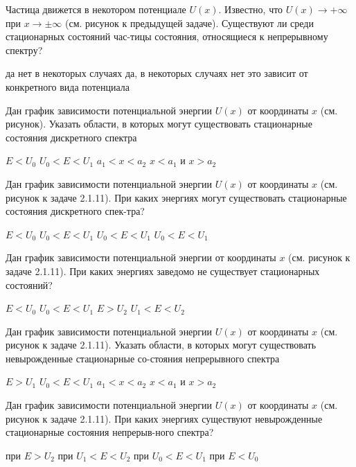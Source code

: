 \documentclass[11pt,a4paper]{exam}
\begin{document}
\begin{questions}
\question Частица движется в некотором потенциале $U(x)$. Известно, что $U(x) \to  + \infty $ при $x \to  \pm \infty $ (см. рисунок к предыдущей задаче). Существуют ли среди стационарных состояний час-тицы состояния, относящиеся к непрерывному спектру?
\begin{choices}
\choice да
\choice нет
\choice в некоторых случаях да, в некоторых случаях нет
\choice это зависит от конкретного вида потенциала
\end{choices}

\question Дан график зависимости потенциальной энергии $U(x)$ от координаты $x$ (см. рисунок). Указать области, в которых могут существовать стационарные состояния дискретного спектра
\begin{choices}
\choice $E < {U_0}$
\choice ${U_0} < E < {U_1}$
\choice ${a_1} < x < {a_2}$
\choice $x < {a_1}$  и $x > {a_2}$
\end{choices}

\question Дан график зависимости потенциальной энергии $U(x)$ от координаты $x$ (см. рисунок к задаче 2.1.11). При каких энергиях могут существовать стационарные состояния дискретного спек-тра?
\begin{choices}
\choice $E < {U_0}$
\choice ${U_0} < E < {U_1}$
\choice ${U_0} < E < {U_1}$
\choice ${U_0} < E < {U_1}$
\end{choices}

\question Дан график зависимости потенциальной энергии от координаты $x$ (см. рисунок к задаче 2.1.11). При каких энергиях заведомо не существует стационарных состояний?
\begin{choices}
\choice $E < {U_0}$ 
\choice ${U_0} < E < {U_1}$  
\choice $E > {U_2}$ 
\choice ${U_1} < E < {U_2}$ 
\end{choices}

\question Дан график зависимости потенциальной энергии $U(x)$ от координаты $x$ (см. рисунок к задаче 2.1.11). Указать области, в которых могут существовать невырожденные стационарные со-стояния непрерывного спектра
\begin{choices}
\choice $E > {U_1}$          
\choice ${U_0} < E < {U_1}$
\choice ${a_1} < x < {a_2}$           
\choice $x < {a_1}$ и $x > {a_2}$
\end{choices}

\question Дан график зависимости потенциальной энергии $U(x)$ от координаты $x$ (см. рисунок к задаче 2.1.11). При каких энергиях существуют невырожденные стационарные состояния непрерыв-ного спектра?
\begin{choices}
\choice при $E > {U_2}$         
\choice при ${U_1} < E < {U_2}$
\choice при ${U_0} < E < {U_1}$       
\choice при $E < {U_0}$
\end{choices}


\end{questions}
\end{document}
